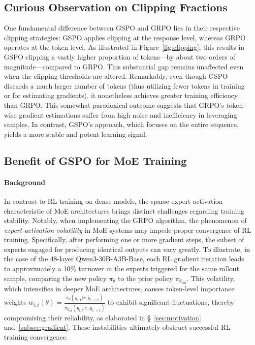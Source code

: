 \subsection{Curious Observation on Clipping Fractions}

One fundamental difference between GSPO and GRPO lies in their respective clipping strategies: GSPO applies clipping at the response level, whereas GRPO operates at the token level. As illustrated in Figure~\ref{fig:clipping}, this results in GSPO clipping a vastly higher proportion of tokens—by about two orders of magnitude—compared to GRPO. This substantial gap remains unaffected even when the clipping thresholds are altered. Remarkably, even though GSPO discards a much larger number of tokens (thus utilizing fewer tokens in training or for estimating gradients), it nonetheless achieves greater training efficiency than GRPO. This somewhat paradoxical outcome suggests that GRPO's token-wise gradient estimations suffer from high noise and inefficiency in leveraging samples. In contrast, GSPO's approach, which focuses on the entire sequence, yields a more stable and potent learning signal.

\subsection{Benefit of GSPO for MoE Training}
\label{subsec:routing_replay}

\paragraph{Background}
In contrast to RL training on dense models, the sparse expert activation characteristic of MoE architectures brings distinct challenges regarding training stability. Notably, when implementing the GRPO algorithm, the phenomenon of \textit{expert-activation volatility} in MoE systems may impede proper convergence of RL training. Specifically, after performing one or more gradient steps, the subset of experts engaged for producing identical outputs can vary greatly. To illustrate, in the case of the 48-layer Qwen3-30B-A3B-Base, each RL gradient iteration leads to approximately a 10\% turnover in the experts triggered for the same rollout sample, comparing the new policy $\pi_{\theta}$ to the prior policy $\pi_{\theta_\text{old}}$.
This volatility, which intensifies in deeper MoE architectures, causes token-level importance weights $w_{i,t}(\theta) = \frac{ \pi_{\theta} (y_{i,t} | x, y_{i,<t}) }{ \pi_{\theta_\text{old}} (y_{i,t} | x,y_{i,<t})}$ to exhibit significant fluctuations, thereby compromising their reliability, as elaborated in \S~\ref{sec:motivation} and~\ref{subsec:gradient}. These instabilities ultimately obstruct successful RL training convergence.


